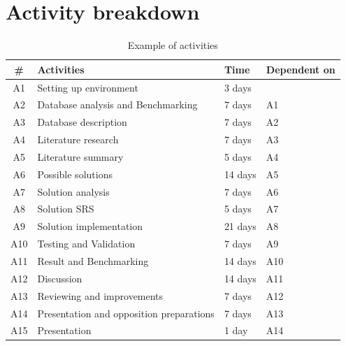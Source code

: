 \documentclass[12pt,a4paper]{article}
\begin{document}
\section*{Activity breakdown}
\begin{table}[H]
    \begin{tabular}{| c | l | l | l |}
    \hline
    \# & \textbf{Activities} & \textbf{Time} & \textbf{Dependent on}\\\hline
		A1 & Setting up environment & 3 days & \\\hline
  		A2 & Database analysis and Benchmarking &  7 days & A1 \\\hline
  		A3 & Database description & 7 days & A2 \\\hline
    A4 & Literature research & 7 days & A3 \\\hline
    A5 & Literature summary & 5 days & A4 \\\hline
    A6 & Possible solutions & 14 days & A5 \\\hline
    A7 & Solution analysis & 7 days & A6 \\\hline
    A8 & Solution SRS & 5 days & A7 \\\hline
    A9 & Solution implementation & 21 days & A8 \\\hline
    A10 & Testing and Validation & 7 days & A9 \\\hline
    A11 & Result and Benchmarking & 14 days & A10 \\\hline
    A12 & Discussion & 14 days & A11 \\\hline
    A13 & Reviewing and improvements & 7 days & A12 \\\hline
    A14 & Presentation and opposition preparations & 7 days & A13 \\\hline
    A15 & Presentation & 1 day & A14\\\hline
    \end{tabular}
    \caption{Example of activities}
\end{table}
\end{document}
